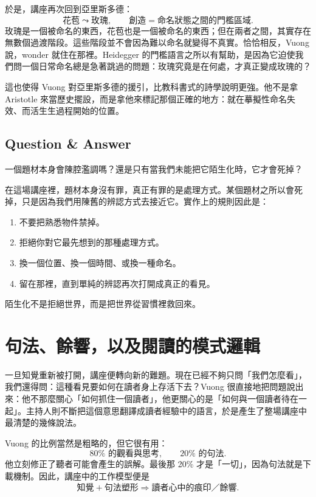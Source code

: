 於是，講座再次回到亞里斯多德：
\begin{equation}
\text{花苞} \leadsto \text{玫瑰}, \qquad \text{創造} = \text{命名狀態之間的門檻區域}.
\end{equation}
玫瑰是一個被命名的東西，花苞也是一個被命名的東西；但在兩者之間，其實存在無數個過渡階段。這些階段並不會因為難以命名就變得不真實。恰恰相反，Vuong 說，wonder 就住在那裡。Heidegger 的門檻語言之所以有幫助，是因為它迫使我們問一個日常命名總是急著跳過的問題：玫瑰究竟是在何處，才真正變成玫瑰的？

這也使得 Vuong 對亞里斯多德的援引，比教科書式的詩學說明更強。他不是拿 Aristotle 來當歷史擺設，而是拿他來標記那個正確的地方：就在摹擬性命名失效、而活生生過程開始的位置。

\subsection{Question \& Answer}

一個題材本身會陳腔濫調嗎？還是只有當我們未能把它陌生化時，它才會死掉？

在這場講座裡，題材本身沒有罪，真正有罪的是處理方式。某個題材之所以會死掉，只是因為我們用陳舊的辨認方式去接近它。實作上的規則因此是：
\begin{enumerate}
\item 不要把熟悉物件禁掉。
\item 拒絕你對它最先想到的那種處理方式。
\item 換一個位置、換一個時間、或換一種命名。
\item 留在那裡，直到單純的辨認再次打開成真正的看見。
\end{enumerate}
陌生化不是拒絕世界，而是把世界從習慣裡救回來。

\section{句法、餘響，以及閱讀的模式邏輯}

一旦知覺重新被打開，講座便轉向新的難題。現在已經不夠只問「我們怎麼看」，我們還得問：這種看見要如何在讀者身上存活下去？Vuong 很直接地把問題說出來：他不那麼關心「如何抓住一個讀者」，他更關心的是「如何與一個讀者待在一起」。主持人則不斷把這個意思翻譯成讀者經驗中的語言，於是產生了整場講座中最清楚的幾條說法。

Vuong 的比例當然是粗略的，但它很有用：
\begin{equation}
80\% \text{ 的觀看與思考}, \qquad 20\% \text{ 的句法}.
\end{equation}
他立刻修正了聽者可能會產生的誤解。最後那 20\% 才是「一切」，因為句法就是下載機制。因此，講座中的工作模型便是
\begin{equation}
\text{知覺} + \text{句法塑形} \Longrightarrow \text{讀者心中的痕印／餘響}.
\end{equation}

